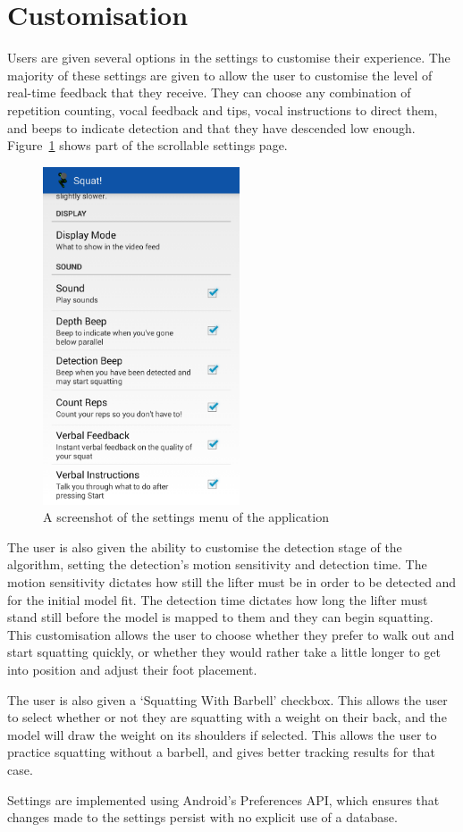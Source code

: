 \section{Customisation}

Users are given several options in the settings to customise their experience. The majority of these settings are given to allow the user to customise the level of real-time feedback that they receive. They can choose any combination of repetition counting, vocal feedback and tips, vocal instructions to direct them, and beeps to indicate detection and that they have descended low enough. Figure~\ref{fig:settings} shows part of the scrollable settings page.

\begin{figure}[H]
    \centering
	\includegraphics[height=10cm]{application/images/settings}
\caption{A screenshot of the settings menu of the application}
\label{fig:settings}
\end{figure}

The user is also given the ability to customise the detection stage of the algorithm, setting the detection's motion sensitivity and detection time. The motion sensitivity dictates how still the lifter must be in order to be detected and for the initial model fit. The detection time dictates how long the lifter must stand still before the model is mapped to them and they can begin squatting. This customisation allows the user to choose whether they prefer to walk out and start squatting quickly, or whether they would rather take a little longer to get into position and adjust their foot placement.

The user is also given a `Squatting With Barbell' checkbox. This allows the user to select whether or not they are squatting with a weight on their back, and the model will draw the weight on its shoulders if selected. This allows the user to practice squatting without a barbell, and gives better tracking results for that case.

Settings are implemented using Android's Preferences API, which ensures that changes made to the settings persist with no explicit use of a database.